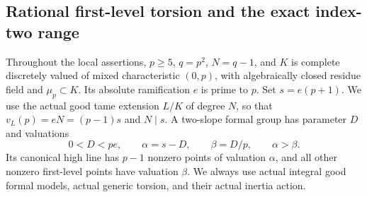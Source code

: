 \subsection{Rational first-level torsion and the exact index-two range}

Throughout the local assertions, \(p\ge5\), \(q=p^2\), \(N=q-1\),
and \(K\) is complete discretely valued of mixed characteristic
\((0,p)\), with algebraically closed residue field and \(\mu_p\subset K\).
Its absolute ramification \(e\) is prime to \(p\). Set \(s=e(p+1)\).
We use the actual good tame extension \(L/K\) of degree \(N\),
so that \(v_L(p)=eN=(p-1)s\) and \(N\mid s\).
A two-slope formal group has parameter \(D\) and valuations
\[
 0<D<pe,\qquad \alpha=s-D,\qquad\beta=D/p,
 \qquad \alpha>\beta.
 \tag{B-RD73.1}
\]
Its canonical high line has \(p-1\) nonzero points of valuation
\(\alpha\), and all other nonzero first-level points have valuation
\(\beta\). We always use actual integral good formal models,
actual generic torsion, and their actual inertia action.

